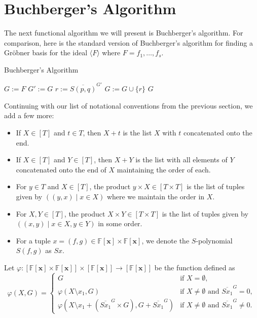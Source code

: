 \documentclass[MS, xcolor=dvipsnames]{wfuthesis}
\def\bF{\mathbb{F}}
\def\and{\text{ and }}
\theoremstyle{definition}
\def\p{\varphi}
\begin{document}

\section{Buchberger's Algorithm}
The next functional algorithm we will present is Buchberger's algorithm. For comparison, here is the standard version of Buchberger's algorithm for finding a Gr\"obner basis for the ideal $\langle F \rangle$ where $F = f_1,\dots,f_s$. \par
\begin{algorithm}
  \caption{Buchberger's Algorithm}
  \begin{algorithmic}
    \State $G:=F$
    \Repeat
      \State $G' := G$
        \State $r := \overline{S(p,q)}^{G'}$
          \State $G := G \cup \{r\}$
        \EndIf
      \EndFor
    \State \Return $G$
  \end{algorithmic}
\end{algorithm}
Continuing with our list of notational conventions from the previous section, we add a few more:
\begin{itemize}
  \item If $X \in [T]$ and $t \in T$, then $X + t$ is the list $X$ with $t$ concatenated onto the end.
  \item If $X \in [T]$ and $Y \in [T]$, then $X + Y$ is the list with all elements of $Y$ concatenated onto the end of $X$ maintaining the order of each.
  \item For $y \in T$ and $X \in [T]$, the product $y \times X \in [T \times T]$ is the list of tuples given by $((y,x) \mid x \in X)$ where we maintain the order in $X$.
  \item For $X,Y \in [T]$, the product $X \times Y \in [T \times T]$ is the list of tuples given by $((x,y) \mid x \in X, y \in Y)$ in some order.
  \item For a tuple $x = (f,g) \in \bF[\mathbf x] \times \bF[\mathbf x]$, we denote the $S$-polynomial $S(f,g)$ as $Sx$.
\end{itemize}
Let $\p: [\bF[\mathbf x] \times \bF[\mathbf x]] \times [\bF[\mathbf x]] \to [\bF[\mathbf x]]$ be the function defined as
\[ \p(X,G) = \begin{cases} G &\text{if } X = \emptyset, \\ \p(X \setminus x_1,G) &\text{if } X \ne \emptyset \and \overline{Sx_1}^{G} = 0, \\ \p\left(X \setminus x_1 + (\overline{Sx_1}^{G} \times G),G + \overline{Sx_1}^{G}\right) &\text{if } X \ne \emptyset \and \overline{Sx_1}^{G} \ne 0. \end{cases} \]
\end{document}
